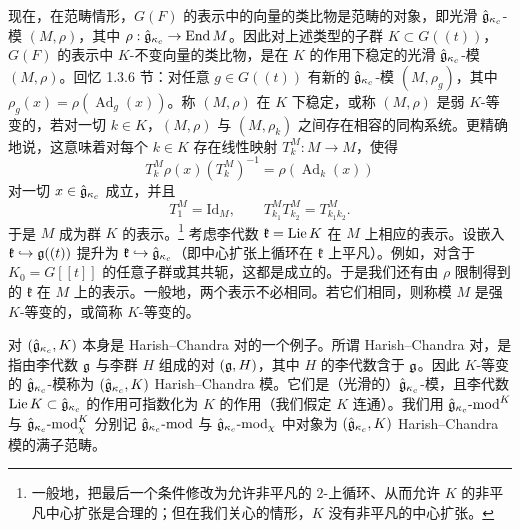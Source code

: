 现在，在范畴情形，$G(F)$ 的表示中的向量的类比物是范畴的对象，即光滑 $\hat{\mathfrak{g}}_{\kappa_c}$-模 $(M,\rho)$，其中 $\rho:\hat{\mathfrak{g}}_{\kappa_c}\to\operatorname{End} M$。因此对上述类型的子群 $K\subset G((t))$，$G(F)$ 的表示中 $K$-不变向量的类比物，是在 $K$ 的作用下稳定的光滑 $\hat{\mathfrak{g}}_{\kappa_c}$-模 $(M,\rho)$。回忆 1.3.6 节：对任意 $g\in G((t))$ 有新的 $\hat{\mathfrak{g}}_{\kappa_c}$-模 $(M,\rho_g)$，其中 $\rho_g(x)=\rho(\operatorname{Ad}_g(x))$。称 $(M,\rho)$ 在 $K$ 下稳定，或称 $(M,\rho)$ 是弱 $K$-等变的，若对一切 $k\in K$，$(M,\rho)$ 与 $(M,\rho_k)$ 之间存在相容的同构系统。更精确地说，这意味着对每个 $k\in K$ 存在线性映射 $T_k^M:M\to M$，使得
\[
    T_k^M\rho(x)(T_k^M)^{-1}=\rho(\operatorname{Ad}_k(x))
\]
对一切 $x\in\hat{\mathfrak{g}}_{\kappa_c}$ 成立，并且
\[
    T_1^M=\mathrm{Id}_M,\qquad T_{k_1}^M T_{k_2}^M=T_{k_1k_2}^M.
\]
于是 $M$ 成为群 $K$ 的表示。\footnote{一般地，把最后一个条件修改为允许非平凡的 $2$-上循环、从而允许 $K$ 的非平凡中心扩张是合理的；但在我们关心的情形，$K$ 没有非平凡的中心扩张。} 考虑李代数 $\mathfrak{k}=\operatorname{Lie} K$ 在 $M$ 上相应的表示。设嵌入 $\mathfrak{k}\hookrightarrow\mathfrak{g}((t))$ 提升为 $\mathfrak{k}\hookrightarrow\hat{\mathfrak{g}}_{\kappa_c}$（即中心扩张上循环在 $\mathfrak{k}$ 上平凡）。例如，对含于 $K_0=G[[t]]$ 的任意子群或其共轭，这都是成立的。于是我们还有由 $\rho$ 限制得到的 $\mathfrak{k}$ 在 $M$ 上的表示。一般地，两个表示不必相同。若它们相同，则称模 $M$ 是强 $K$-等变的，或简称 $K$-等变的。

对 $(\hat{\mathfrak{g}}_{\kappa_c},K)$ 本身是 Harish--Chandra 对的一个例子。所谓 Harish--Chandra 对，是指由李代数 $\mathfrak{g}$ 与李群 $H$ 组成的对 $(\mathfrak{g},H)$，其中 $H$ 的李代数含于 $\mathfrak{g}$。因此 $K$-等变的 $\hat{\mathfrak{g}}_{\kappa_c}$-模称为 $(\hat{\mathfrak{g}}_{\kappa_c},K)$ Harish--Chandra 模。它们是（光滑的）$\hat{\mathfrak{g}}_{\kappa_c}$-模，且李代数 $\operatorname{Lie} K\subset\hat{\mathfrak{g}}_{\kappa_c}$ 的作用可指数化为 $K$ 的作用（我们假定 $K$ 连通）。我们用 $\hat{\mathfrak{g}}_{\kappa_c}\text{-}\mathrm{mod}^K$ 与 $\hat{\mathfrak{g}}_{\kappa_c}\text{-}\mathrm{mod}_\chi^K$ 分别记 $\hat{\mathfrak{g}}_{\kappa_c}\text{-}\mathrm{mod}$ 与 $\hat{\mathfrak{g}}_{\kappa_c}\text{-}\mathrm{mod}_\chi$ 中对象为 $(\hat{\mathfrak{g}}_{\kappa_c},K)$ Harish--Chandra 模的满子范畴。


